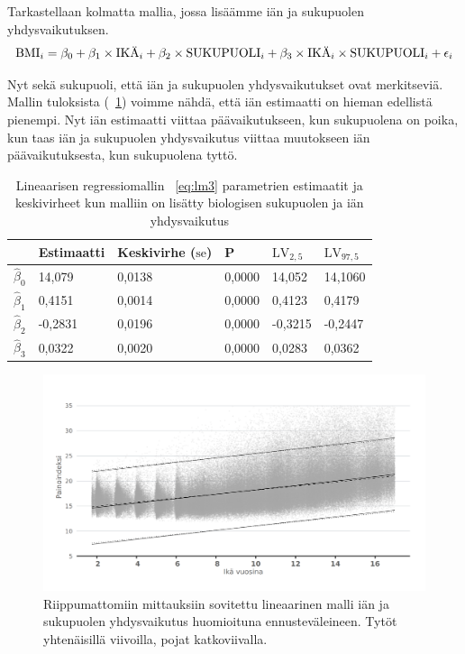 \documentclass[finnish]{docopts}
\begin{document}
Tarkastellaan kolmatta mallia, jossa lisäämme iän ja sukupuolen yhdysvaikutuksen.\\

\begin{equation}
\text{BMI}_i = \beta_0 + \beta_1 \times \text{IKÄ}_i + \beta_2 \times \text{SUKUPUOLI}_i + \beta_3 \times \text{IKÄ}_i \times \text{SUKUPUOLI}_i + \epsilon_i \label{eq:lm3}\\
\end{equation}

Nyt sekä sukupuoli, että iän ja sukupuolen yhdysvaikutukset ovat merkitseviä. Mallin tuloksista (~\ref{table:lm3}) voimme nähdä, että iän estimaatti on hieman edellistä pienempi. Nyt iän estimaatti viittaa päävaikutukseen, kun sukupuolena on poika, kun taas iän ja sukupuolen yhdysvaikutus viittaa muutokseen iän päävaikutuksesta, kun sukupuolena tyttö.\\

\begin{table}[H]
\centering
\begin{tabular}{llllll}
\toprule
  & Estimaatti & Keskivirhe ($\text{se}$) & P & $\text{LV}_{2,5}$ & $\text{LV}_{97,5}$\\
\midrule
$\hat{\beta}_0$ & 14,079 & 0,0138 & 0,0000 & 14,052 & 14,1060\\
$\hat{\beta}_1$ & 0,4151 & 0,0014 & 0,0000 & 0,4123 & 0,4179\\
$\hat{\beta}_2$ & -0,2831 & 0,0196 & 0,0000 & -0,3215 & -0,2447\\
$\hat{\beta}_3$ & 0,0322 & 0,0020 & 0,0000 & 0,0283 & 0,0362\\
\bottomrule
\end{tabular}
\caption{Lineaarisen regressiomallin ~\ref{eq:lm3} parametrien estimaatit ja keskivirheet kun malliin on lisätty biologisen sukupuolen ja iän yhdysvaikutus}
\label{table:lm3}
\end{table}

\begin{figure}[H]
\centering
  \includegraphics[scale=0.8]{kuvaajat/lm_baseline.png}
  \caption{Riippumattomiin mittauksiin sovitettu lineaarinen malli iän ja sukupuolen yhdysvaikutus huomioituna ennusteväleineen. Tytöt yhtenäisillä viivoilla, pojat katkoviivalla.}
  \label{fig:lm_baseline}
\end{figure}
\end{document}
